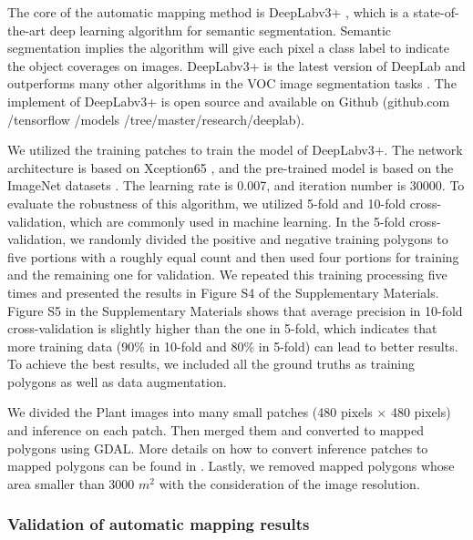 \documentclass[preprint,12pt,authoryear]{elsarticle}
\begin{document}
The core of the automatic mapping method is DeepLabv3+ \citep{chen_encoder-decoder_2018} , which is a state-of-the-art deep learning algorithm for semantic segmentation. Semantic segmentation implies the algorithm will give each pixel a class label to indicate the object coverages on images. DeepLabv3+ is the latest version of DeepLab and outperforms many other algorithms in the VOC image segmentation tasks \citep{everingham_pascal_2015}. The implement of DeepLabv3+ is open source and available on Github (github.com /tensorflow /models /tree/master/research/deeplab).

We utilized the training patches to train the model of DeepLabv3+. The network architecture is based on Xception65 \citep{chollet2017xception}, and the pre-trained model is based on the ImageNet datasets \citep{russakovsky2015imagenet}. The learning rate is 0.007, and iteration number is 30000. To evaluate the robustness of this algorithm, we utilized 5-fold and 10-fold cross-validation, which are commonly used in machine learning. In the 5-fold cross-validation, we randomly divided the positive and negative training polygons to five portions with a roughly equal count and then used four portions for training and the remaining one for validation. We repeated this training processing five times and presented the results in Figure S4 of the Supplementary Materials. Figure S5 in the Supplementary Materials shows that average precision in 10-fold cross-validation is slightly higher than the one in 5-fold, which indicates that more training data (90\% in 10-fold and 80\% in 5-fold) can lead to better results. To achieve the best results, we included all the ground truths as training polygons as well as data augmentation. 

We divided the Plant images into many small patches (480 pixels $\times$  480 pixels) and inference on each patch. Then merged them and converted to mapped polygons using GDAL. More details on how to convert inference patches to mapped polygons can be found in \cite{huang2018automatic}. Lastly, we removed mapped polygons whose area smaller than 3000 $m^2$ with the consideration of the image resolution.  

\subsubsection{Validation of automatic mapping results}
\label{subsubsec_validation}
\end{document}
